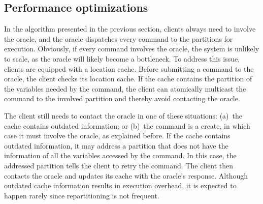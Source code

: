 \subsection{Performance optimizations}
\label{sec:dynastar-optm}

In the algorithm presented in the previous section, clients always need to
involve the oracle, and the oracle dispatches every command to the partitions
for execution. Obviously, if every command involves the oracle, the system is
unlikely to scale, as the oracle will likely become a bottleneck. To address
this issue, clients are equipped with a location cache. Before submitting a
command to the oracle, the client checks its location cache. If the cache
contains the partition of the variables needed by the command, the client can
atomically multicast the command to the involved partition and thereby avoid
contacting the oracle.

The client still needs to contact the oracle in one of these situations: (a)~the
cache contains outdated information; or (b)~the command is a create, in
which case it must involve the oracle, as explained before. If the cache contains
outdated information, it may address a partition that does not have the
information of all the variables accessed by the command. In this case, the
addressed partition tells the client to retry the command. The client then
contacts the oracle and updates its cache with the oracle's response. Although
outdated cache information results in execution overhead, it is expected to
happen rarely since repartitioning is not frequent.
